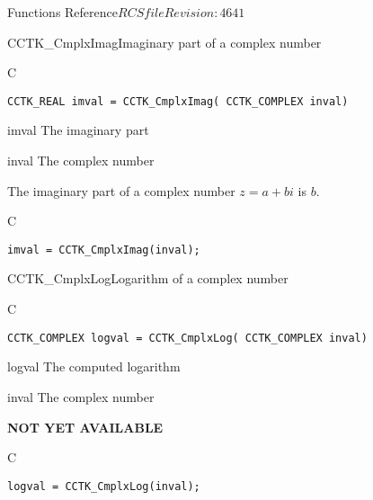 \begin{cactuspart}{ Functions Reference}{$RCSfile$}{$Revision: 4641 $}
\begin{FunctionDescription}{CCTK\_CmplxImag}{Imaginary part of a complex number}
\label{CCTK-CmplxImag}
\begin{SynopsisSection}
\begin{Synopsis}{C}
\begin{verbatim}CCTK_REAL imval = CCTK_CmplxImag( CCTK_COMPLEX inval)\end{verbatim}
\end{Synopsis}
\end{SynopsisSection}
\begin{ParameterSection}
\begin{Parameter}{imval}
The imaginary part
\end{Parameter}
\begin{Parameter}{inval}
The complex number
\end{Parameter}
\end{ParameterSection}
\begin{Discussion}
The imaginary part of a complex number $z=a+bi$ is $b$.
\end{Discussion}
\begin{ExampleSection}
\begin{Example}{C}
\begin{verbatim}
imval = CCTK_CmplxImag(inval);
\end{verbatim}
\end{Example}
\end{ExampleSection}
\end{FunctionDescription}

\begin{FunctionDescription}{CCTK\_CmplxLog}{Logarithm of a complex number}
\label{CCTK-CmplxLog}
\begin{SynopsisSection}
\begin{Synopsis}{C}
\begin{verbatim}CCTK_COMPLEX logval = CCTK_CmplxLog( CCTK_COMPLEX inval)\end{verbatim}
\end{Synopsis}
\end{SynopsisSection}
\begin{ParameterSection}
\begin{Parameter}{logval}
The computed logarithm
\end{Parameter}
\begin{Parameter}{inval}
The complex number
\end{Parameter}
\end{ParameterSection}
\begin{Discussion}
{\bf NOT YET AVAILABLE}
\end{Discussion}
\begin{ExampleSection}
\begin{Example}{C}
\begin{verbatim}
logval = CCTK_CmplxLog(inval);
\end{verbatim}
\end{Example}
\end{ExampleSection}
\end{FunctionDescription}


\end{cactuspart}
